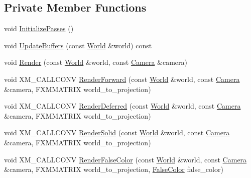 \subsection*{Private Member Functions}
\begin{DoxyCompactItemize}
\item 
void \hyperlink{classmage_1_1rendering_1_1_renderer_1_1_impl_a0db15a325a2e2242a76323b27acec12f}{Initialize\+Passes} ()
\item 
void \hyperlink{classmage_1_1rendering_1_1_renderer_1_1_impl_a0886adfdf0f7c7f7d9e8d77a8d429844}{Update\+Buffers} (const \hyperlink{classmage_1_1rendering_1_1_world}{World} \&world) const
\item 
void \hyperlink{classmage_1_1rendering_1_1_renderer_1_1_impl_af2d46a795175867592dc70e63c93967b}{Render} (const \hyperlink{classmage_1_1rendering_1_1_world}{World} \&world, const \hyperlink{classmage_1_1rendering_1_1_camera}{Camera} \&camera)
\item 
void X\+M\+\_\+\+C\+A\+L\+L\+C\+O\+NV \hyperlink{classmage_1_1rendering_1_1_renderer_1_1_impl_a42d47faf6879db3bc00190b9e626eef9}{Render\+Forward} (const \hyperlink{classmage_1_1rendering_1_1_world}{World} \&world, const \hyperlink{classmage_1_1rendering_1_1_camera}{Camera} \&camera, F\+X\+M\+M\+A\+T\+R\+IX world\+\_\+to\+\_\+projection)
\item 
void X\+M\+\_\+\+C\+A\+L\+L\+C\+O\+NV \hyperlink{classmage_1_1rendering_1_1_renderer_1_1_impl_add8f54938b1bd940a032e5165c60a09a}{Render\+Deferred} (const \hyperlink{classmage_1_1rendering_1_1_world}{World} \&world, const \hyperlink{classmage_1_1rendering_1_1_camera}{Camera} \&camera, F\+X\+M\+M\+A\+T\+R\+IX world\+\_\+to\+\_\+projection)
\item 
void X\+M\+\_\+\+C\+A\+L\+L\+C\+O\+NV \hyperlink{classmage_1_1rendering_1_1_renderer_1_1_impl_a39a9a77669ce1c2615f61806dd4f06e3}{Render\+Solid} (const \hyperlink{classmage_1_1rendering_1_1_world}{World} \&world, const \hyperlink{classmage_1_1rendering_1_1_camera}{Camera} \&camera, F\+X\+M\+M\+A\+T\+R\+IX world\+\_\+to\+\_\+projection)
\item 
void X\+M\+\_\+\+C\+A\+L\+L\+C\+O\+NV \hyperlink{classmage_1_1rendering_1_1_renderer_1_1_impl_aecb98e030f5486bbd31384af5b6e77b0}{Render\+False\+Color} (const \hyperlink{classmage_1_1rendering_1_1_world}{World} \&world, const \hyperlink{classmage_1_1rendering_1_1_camera}{Camera} \&camera, F\+X\+M\+M\+A\+T\+R\+IX world\+\_\+to\+\_\+projection, \hyperlink{namespacemage_1_1rendering_a6c3d1f4e7a5ae72dc07226e971205534}{False\+Color} false\+\_\+color)

\end{DoxyCompactItemize}
